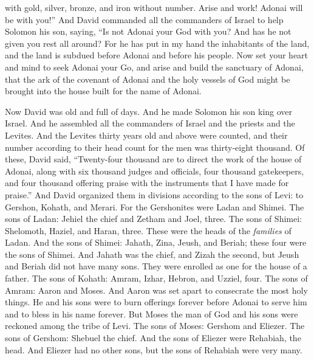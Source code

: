 \begin{biblechapter}
\verse with gold, silver, bronze, and iron without number. Arise and work! Adonai will be with you!”
\verse And David commanded all the commanders of Israel to help Solomon his son, saying,
\verse “Is not Adonai your God with you? And has he not given you rest all around? For he has put in my hand the inhabitants of the land, and the land is subdued before Adonai and before his people.
\verse Now set your heart and mind to seek Adonai your Go, and arise and build the sanctuary of Adonai, that the ark of the covenant of Adonai and the holy vessels of God might be brought into the house built for the name of Adonai.
\end{biblechapter}

\begin{biblechapter} %
 Now David was old and full of days. And he made Solomon his son king over Israel.
\verse And he assembled all the commanders of Israel and the priests and the Levites.
\verse And the Levites thirty years old and above were counted, and their number according to their head count for the men was thirty-eight thousand.
\verse Of these, David said, “Twenty-four thousand are to direct the work of the house of Adonai, along with six thousand judges and officials,
\verse four thousand gatekeepers, and four thousand offering praise with the instruments that I have made for praise.”
\verse And David organized them in divisions according to the sons of Levi: to Gershon, Kohath, and Merari.
\verse For the Gershonites were Ladan and Shimei.
\verse The sons of Ladan: Jehiel the chief and Zetham and Joel, three.
\verse The sons of Shimei: Shelomoth, Haziel, and Haran, three. These were the heads of the \textit{families} of Ladan.
\verse And the sons of Shimei: Jahath, Zina, Jeush, and Beriah; these four were the sons of Shimei.
\verse And Jahath was the chief, and Zizah the second, but Jeush and Beriah did not have many sons. They were enrolled as one for the house of a father.
\verse The sons of Kohath: Amram, Izhar, Hebron, and Uzziel, four.
\verse The sons of Amram: Aaron and Moses. And Aaron was set apart to consecrate the most holy things. He and his sons were to burn offerings forever before Adonai to serve him and to bless in his name forever.
\verse But Moses the man of God and his sons were reckoned among the tribe of Levi.
\verse The sons of Moses: Gershom and Eliezer.
\verse The sons of Gershom: Shebuel the chief.
\verse And the sons of Eliezer were Rehabiah, the head. And Eliezer had no other sons, but the sons of Rehabiah were very many.

\end{biblechapter}
